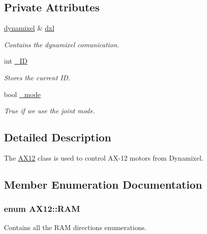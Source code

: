 \subsection*{Private Attributes}
\begin{DoxyCompactItemize}
\item 
\hyperlink{classdynamixel}{dynamixel} \& \hyperlink{class_a_x12_a819a7760294ffa2022c5359155d6b51a}{dxl}
\begin{DoxyCompactList}\small\item\em Contains the dynamixel comunication. \end{DoxyCompactList}\item 
int \hyperlink{class_a_x12_a0ae2b35fee3d120075e1d8f1e2055804}{\+\_\+\+I\+D}
\begin{DoxyCompactList}\small\item\em Stores the current I\+D. \end{DoxyCompactList}\item 
bool \hyperlink{class_a_x12_a2fd07e2e636003227a32d09d211bd6d4}{\+\_\+mode}
\begin{DoxyCompactList}\small\item\em True if we use the joint mode. \end{DoxyCompactList}\end{DoxyCompactItemize}


\subsection{Detailed Description}
The \hyperlink{class_a_x12}{A\+X12} class is used to control A\+X-\/12 motors from Dynamixel. 

\subsection{Member Enumeration Documentation}
\hypertarget{class_a_x12_a672068c48bbee921e5856cc44b1c81c1}{}
\subsubsection[{R\+A\+M}]{\setlength{\rightskip}{0pt plus 5cm}enum {\bf A\+X12\+::\+R\+A\+M}\hspace{0.3cm}{\ttfamily [private]}}\label{class_a_x12_a672068c48bbee921e5856cc44b1c81c1}


Contains all the R\+A\+M directions enumerations. 

